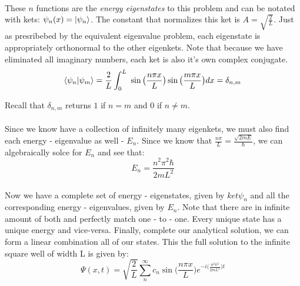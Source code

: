 \documentclass[12pt,letterpaper]{book}
\begin{document}
\paragraph*{}These $n$ functions are the \textit{energy eigenstates} to this problem and can be notated with kets: $\psi_n(x) = \ket{\psi_n}$. The constant that normalizes this ket is $ A = \sqrt{\frac{2}{L}}$. Just as presribebed by the equivalent eigenvalue problem, each eigenstate is appropriately orthonormal to the other eigenkets. Note that because we have eliminated all imaginary numbers, each ket is also it's own complex conjugate.
\begin{equation}
\braket{\psi_n}{\psi_m} = \frac{2}{L}\int_0^L \
\sin\big( \frac{n\pi x}{L} \big) \sin\big( \frac{m\pi x}{L} \big) dx =
\delta_{n,m}
\end{equation}
\begin{flushright}
Recall that $\delta_{n,m}$ returns $1$ if $n = m$ and $0$ if $n \neq m$.
\end{flushright}
\paragraph*{}Since we know have a collection of infinitely many eigenkets, we must also find each energy - eigenvalue as well - $E_n$. Since we know that $\frac{n\pi}{L} = \frac{\sqrt{2mE}}{\hbar}$, we can algebraically solce for $E_n$ and see that:
\begin{equation}
\label{energy for ISW}
E_n = \frac{n^2 \pi^2 \hbar}{2mL^2}
\end{equation}
\paragraph*{}Now we have a complete set of energy - eigenstates, given by $ket{\psi_n}$ and all the corresponding energy - eigenvalues, given by $E_n$. Note that there are in infinite amount of both and perfectly match one - to - one. Every unique state has a unique energy and vice-versa. Finally, complete our analytical solution, we can form a linear combination all of our states. This the full solution to the infinite square well of width L is given by:
\begin{equation}
\label{ISW Full Solution}
\Psi(x,t) = \sqrt{\frac{2}{L}} \sum_n^{\infty} 
c_n \sin \Big( \frac{n\pi x}{L} \Big)
e^{-i\big( \frac{n^2 \pi^2}{2mL^2} \big)t}
\end{equation} 

\end{document}
